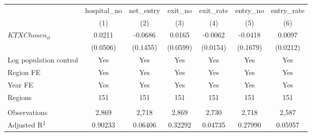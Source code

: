 \begingroup
\centering
\begin{tabular}{lcccccc}
   \toprule
                          & hospital\_no  & net\_entry  & exit\_no  & exit\_rate  & entry\_no  & entry\_rate \\    
                          & (1)           & (2)         & (3)       & (4)         & (5)        & (6)\\  
   \midrule 
   $KTXChosen_{it}$       & 0.0211        & -0.0686     & 0.0165    & -0.0062     & -0.0418    & 0.0097\\   
                          & (0.0506)      & (0.1455)    & (0.0599)  & (0.0154)    & (0.1679)   & (0.0212)\\   
   Log population control & Yes           & Yes         & Yes       & Yes         & Yes        & Yes\\  
   Region FE              & Yes           & Yes         & Yes       & Yes         & Yes        & Yes\\  
   Year FE                & Yes           & Yes         & Yes       & Yes         & Yes        & Yes\\  
   Regions                & 151           & 151         & 151       & 151         & 151        & 151\\  
    \\
   Observations           & 2,869         & 2,718       & 2,869     & 2,730       & 2,718      & 2,587\\  
   Adjusted R$^2$         & 0.90233       & 0.06406     & 0.32292   & 0.04735     & 0.27990    & 0.05957\\  
   \bottomrule
\end{tabular}
\par\endgroup
